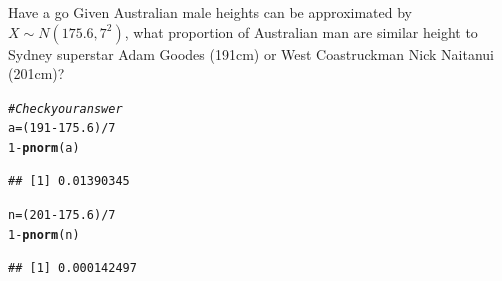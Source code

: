 \documentclass[t,xcolor=pdftex,dvipsnames,table]{beamer}
\makeatletter
\newcommand{\hlnum}[1]{\textcolor[rgb]{0.686,0.059,0.569}{#1}}%
\newcommand{\hlcom}[1]{\textcolor[rgb]{0.678,0.584,0.686}{\textit{#1}}}%
\newcommand{\hlopt}[1]{\textcolor[rgb]{0,0,0}{#1}}%
\newcommand{\hlstd}[1]{\textcolor[rgb]{0.345,0.345,0.345}{#1}}%
\newcommand{\hlkwb}[1]{\textcolor[rgb]{0.69,0.353,0.396}{#1}}%
\newcommand{\hlkwd}[1]{\textcolor[rgb]{0.737,0.353,0.396}{\textbf{#1}}}%
\newenvironment{kframe}{%
 \def\at@end@of@kframe{}%
 \ifinner\ifhmode%
  \def\at@end@of@kframe{\end{minipage}}%
  \begin{minipage}{\columnwidth}%
 \fi\fi%
 \def\FrameCommand##1{\hskip\@totalleftmargin \hskip-\fboxsep
 \colorbox{shadecolor}{##1}\hskip-\fboxsep
     \hskip-\linewidth \hskip-\@totalleftmargin \hskip\columnwidth}%
 \MakeFramed {\advance\hsize-\width
   \@totalleftmargin\z@ \linewidth\hsize
   \@setminipage}}%
 {\par\unskip\endMakeFramed%
 \at@end@of@kframe}
\newenvironment{knitrout}{}{} %
\makeatother
\begin{document}
\begin{frame}[fragile]\frametitle{}

\begin{alertblock}{Have a go}
Given Australian male heights can be approximated by $X \sim N(175.6,7^2)$, what proportion of Australian man are similar height to Sydney superstar Adam Goodes (191cm) or West Coastruckman Nick Naitanui (201cm)?

\end{alertblock}

\begin{knitrout}
\color{fgcolor}\begin{kframe}
\begin{alltt}
\hlcom{#Check your answer}
\hlstd{a} \hlkwb{=} \hlstd{(}\hlnum{191}\hlopt{-}\hlnum{175.6}\hlstd{)}\hlopt{/}\hlnum{7}
\hlnum{1}\hlopt{-} \hlkwd{pnorm}\hlstd{(a)}
\end{alltt}
\begin{verbatim}
## [1] 0.01390345
\end{verbatim}
\begin{alltt}
\hlstd{n} \hlkwb{=} \hlstd{(}\hlnum{201}\hlopt{-}\hlnum{175.6}\hlstd{)}\hlopt{/}\hlnum{7}
\hlnum{1}\hlopt{-} \hlkwd{pnorm}\hlstd{(n)}
\end{alltt}
\begin{verbatim}
## [1] 0.000142497
\end{verbatim}
\end{kframe}
\end{knitrout}
\end{frame}
\end{document}
